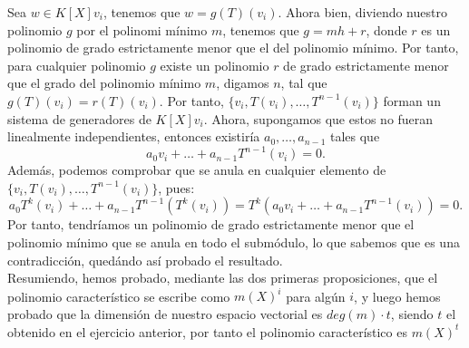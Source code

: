 Sea \(w \in K[X]v_i\), tenemos que  \(w = g(T)(v_i)\). Ahora bien, diviendo nuestro polinomio  \(g\) por el polinomi mínimo  \(m\), tenemos que  \(g = mh + r\), donde \(r\) es un polinomio de grado estrictamente menor que el del polinomio mínimo. Por tanto, para cualquier polinomio \(g\) existe un polinomio \(r\) de grado estrictamente menor que el grado del polinomio mínimo \(m\), digamos \(n\), tal que \(g(T)(v_i) = r(T)(v_i)\). Por tanto, \(\{v_i, T(v_i), \dots, T^{n-1}(v_i)\}\) forman un sistema de generadores de \(K[X]v_i\). Ahora, supongamos que estos no fueran linealmente independientes, entonces existiría \(a_0, \dots, a_{n-1}\) tales que
\[
a_0v_i + \dots + a_{n-1}T^{n-1}(v_i) = 0
.\]
Además, podemos comprobar que se anula en cualquier elemento de \(\{v_i, T(v_i), \dots, T^{n-1}(v_i)\}\), pues:
\[
a_0T^k(v_i) + \dots + a_{n-1}T^{n-1}(T^k(v_i)) = T^k(a_0v_i + \dots + a_{n-1}T^{n-1}(v_i)) = 0
.\]
Por tanto, tendríamos un polinomio de grado estrictamente menor que el polinomio mínimo que se anula en todo el submódulo, lo que sabemos que es una contradicción, quedándo así probado el resultado.\\

Resumiendo, hemos probado, mediante las dos primeras proposiciones, que el polinomio característico se escribe como \(m(X)^i\) para algún  \(i\), y luego hemos probado que la dimensión de nuestro espacio vectorial es  \(deg(m)\cdot t\), siendo \(t\) el obtenido en el ejercicio anterior, por tanto el polinomio característico es \(m(X)^t\)

